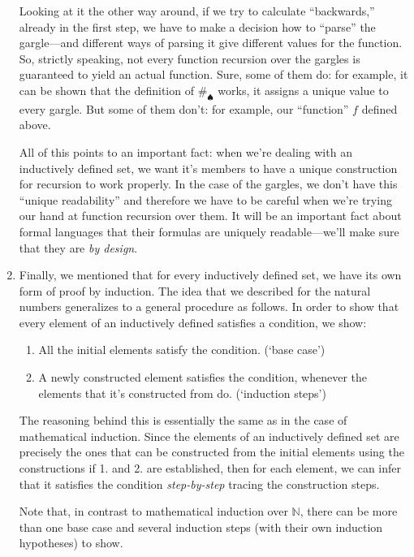 \begin{enumerate}[{\thesection}.1]
\begin{itemize}
		
		\end{itemize}
		Looking at it the other way around, if we try to calculate ``backwards,'' already in the first step, we have to make a decision how to ``parse'' the gargle---and different ways of parsing it give different values for the function. So, strictly speaking, not every function recursion over the gargles is guaranteed to yield an actual function. Sure, some of them do: for example, it can be shown that the definition of $\#_\spadesuit$ works, it assigns a unique value to every gargle. But some of them don't: for example, our ``function'' $f$ defined above.
		
		All of this points to an important fact: when we're dealing with an inductively defined set, we want it's members to have a unique construction for recursion to work properly. In the case of the gargles, we don't have this ``unique readability'' and therefore we have to be careful when we're trying our hand at function recursion over them. It will be an important fact about formal languages that their formulas are uniquely readable---we'll make sure that they are \emph{by design}. 
		
		\item Finally, we mentioned that for every inductively defined set, we have its own form of proof by induction. The idea that we described for the natural numbers generalizes to a general procedure as follows. In order to show that every element of an inductively defined satisfies a condition, we show:
		\begin{enumerate}[1.]
			
			\item All the initial elements satisfy the condition. (`base case')
			
			\item A newly constructed element satisfies the condition, whenever the elements that it's constructed from do. (`induction steps')
		
		\end{enumerate}
		
		The reasoning behind this is essentially the same as in the case of mathematical induction. Since the elements of an inductively defined set are precisely the ones that can be constructed from the initial elements using the constructions if 1. and 2. are established, then for each element, we can infer that it satisfies the condition \emph{step-by-step} tracing the construction steps. 
		
		Note that, in contrast to mathematical induction over $\mathbb{N}$, there can be more than one base case and several induction steps (with their own induction hypotheses) to show.
				

\end{enumerate}
